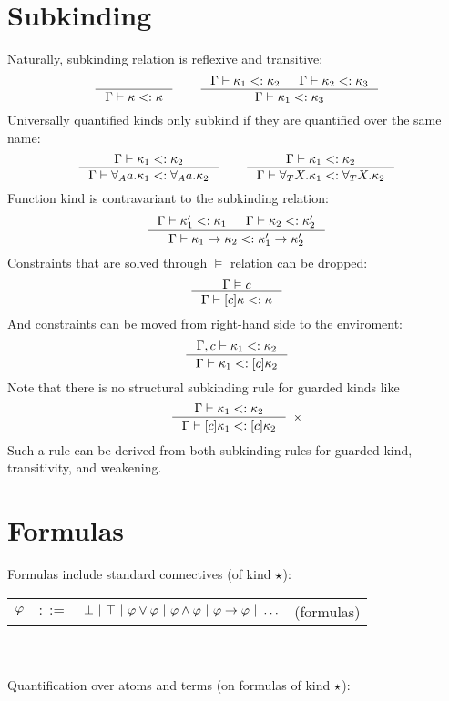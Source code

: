 \documentclass[english, mgr]{iithesis}
\begin{document}
\section{Subkinding}
Naturally, subkinding relation is reflexive and transitive:
$$
\inference{
}{
  \cEnv \vdash \kind \subkind \kind
}
\qquad
\inference{
  \cEnv \vdash \kind_1 \subkind \kind_2 &
  \cEnv \vdash \kind_2 \subkind \kind_3
}{
  \cEnv \vdash \kind_1 \subkind \kind_3
}
$$
Universally quantified kinds only subkind if they are quantified over the same name:
$$
\inference{
  \cEnv \vdash \kind_1 \subkind \kind_2
}{
  \cEnv \vdash \kForallAtom{\atomv} \kind_1 \subkind \kForallAtom{\atomv} \kind_2
}
\qquad
\inference{
  \cEnv \vdash \kind_1 \subkind \kind_2
}{
  \cEnv \vdash \kForallTerm{\termv} \kind_1 \subkind \kForallTerm{\termv} \kind_2
}
$$
Function kind is contravariant to the subkinding relation:
$$
\inference{
  \cEnv \vdash \kind_1' \subkind \kind_1 &
  \cEnv \vdash \kind_2 \subkind \kind_2'
}{
  \cEnv \vdash \kind_1 \karrow \kind_2 \subkind \kind_1' \karrow \kind_2'
}
$$
Constraints that are solved through $\vDash$ relation can be dropped:
$$
\inference{
  \cEnv \vDash \constr
}{
  \cEnv \vdash \kGuard{\constr}\kind \subkind \kind
}
$$
And constraints can be moved from right-hand side to the enviroment:
$$
\inference{
  \cEnv, \constr \vdash \kind_1 \subkind \kind_2
}{
  \cEnv \vdash \kind_1 \subkind \kGuard{\constr}\kind_2
}
$$
Note that there is no structural subkinding rule for guarded kinds like
$$
\inference{\cEnv \vdash \kind_1 \subkind \kind_2}{
  \cEnv \vdash \kGuard{\constr} \kind_1 \subkind \kGuard{\constr} \kind_2
}[\ensuremath{\times}]
$$
Such a rule can be derived from both subkinding rules for guarded kind,
transitivity, and weakening.

\section{Formulas}
Formulas include standard connectives (of kind $\star$):

\begin{tabular}{rrlr}
$\varphi$ & $::=$ & $\bot
               \ |\  \top
               \ |\  \varphi \vee \varphi
               \ |\  \varphi \wedge \varphi
               \ |\  \varphi \to \varphi
               \ |\  \ldots $ & (formulas)
\end{tabular}
\\ \\
Quantification over atoms and terms (on formulas of kind $\star$):
\end{document}
